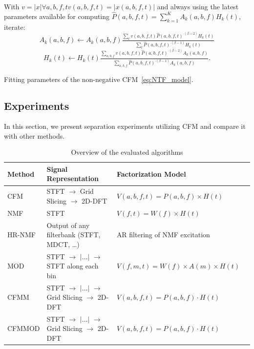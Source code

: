 \begin{algorithm}
With $v=\left|x\right| \forall a,b,f,t v(a,b,f,t) = |x(a,b,f,t)|$ and always using the latest
parameters available for computing
 $\hat{P}\left(a,b,f,t\right)=\sum\limits_{k=1}^{K}A_{k}\left(a,b,f\right)H_{k}\left(t\right)$,
iterate:
\[
A_{k}\left(a,b,f\right)\leftarrow A_{k}\left(a,b,f\right)\tfrac{\sum_{t}v\left(a,b,f,t\right)\hat{P}\left(a,b,f,t\right)^{\cdot\left(\beta-2\right)}H_{k}\left(t\right)}{\sum_{t}\hat{P}\left(a,b,f,t\right)^{\cdot\left(\beta-1\right)}H_{k}\left(t\right)}
\]
\[
H_{k}\left(t\right)\leftarrow H_{k}\left(t\right)\tfrac{\sum_{a,b,f}v\left(a,b,f,t\right)\hat{P}\left(a,b,f,t\right)^{\cdot\left(\beta-2\right)}A_{k}\left(a,b,f\right)}{\sum_{a,b,f}\hat{P}\left(a,b,f,t\right)^{\cdot\left(\beta-1\right)}A_{k}\left(a,b,f\right)}.
\]

\caption{Fitting parameters of the non-negative CFM~\eqref{eq:NTF_model}.\label{alg:Fitting-NTF}}
\end{algorithm}

\subsection{Experiments}
\label{sec:experiment}

In this section, we present separation experiments utilizing CFM and compare it with other methods.

\begin{table}[ht!]
  \centering
  \scriptsize
\begin{tabular}{ llll }
    \toprule
    Method & Signal Representation & Factorization Model \\
    \midrule
    CFM~\cite{stoter16} & STFT $\rightarrow$ Grid Slicing $\rightarrow$ 2D-DFT & $V(a,b,f,t) = P(a,b,f)\times H(t)$ \\
    NMF~\cite{virtanen07} & STFT & $V(f,t) = W(f)\times H(t)$ \\
    HR-NMF~\cite{badeau13} & Output of any filterbank (STFT, MDCT, \ldots)  & AR filtering of NMF excitation \\
    MOD~\cite{barker13} & STFT $\rightarrow$ $|\ldots|$ $\rightarrow$ STFT along each bin & $V(f,m,t) = W(f)\times A(m)\times H(t)$ \\
    CFMM & STFT $\rightarrow$ $|\ldots|$ $\rightarrow$ Grid Slicing $\rightarrow$ 2D-DFT & $V(a,b,f,t) = P(a,b,f)\cdot H(t)$ \\
    CFMMOD & STFT $\rightarrow$ $|\ldots|$ $\rightarrow$ Grid Slicing $\rightarrow$ 2D-DFT & $V(a,b,f,t) = P(a,b,f)\cdot H(t)$ \\
    \bottomrule
\end{tabular}
\caption{Overview of the evaluated algorithms}
\label{tab:methods}
\end{table}

